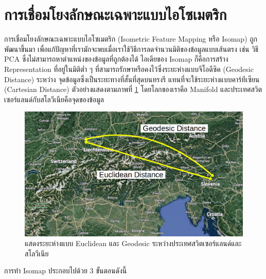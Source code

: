 \section{การเชื่อมโยงลักษณะเฉพาะแบบไอโซเมตริก}
\label{sec:isomap}

การเชื่อมโยงลักษณะเฉพาะแบบไอโซเมตริก (Isometric Feature Mapping หรือ Isomap)\autocite{tenenbaum2000} ถูกพัฒนาขึ้นมา%
เพื่อแก้ปัญหาที่เรามักจะพบเมื่อเราใช้วิธีการลดจำนวนมิติของข้อมูลแบบเส้นตรง เช่น วิธี PCA ซึ่งไม่สามารถหาตำแหน่งของข้อมูลที่ถูกต้องได้ ไอเดียของ 
Isomap ก็คือการสร้าง Representation ที่อยู่ในมิติต่ำ ๆ ที่สามารถรักษาหรือคงไว้ซึ่งระยะห่างแบบจีโอดีซิค (Geodesic Distance) ระหว่าง%
จุดข้อมูลซึ่งเป็นระยะทางที่สั้นที่สุดบนทรงรี แทนที่จะใช้ระยะห่างแบบคาร์ทีเซียน (Cartesian Distance) ตัวอย่างแสดงตามภาพที่
\ref{fig:map_geodesic_euclidean} โดยโลกของเราคือ Manifold และประเทศสวิตเซอร์แลนด์กับสโลวีเนียคือจุดของข้อมูล

\begin{figure}[htbp]
    \centering
    \includegraphics[width=0.9\linewidth]{fig/map_geodesic_euclidean.png}
    \caption{แสดงระยะห่างแบบ Euclidean และ Geodesic ระหว่างประเทศสวิตเซอร์แลนด์และสโลวีเนีย}
    \label{fig:map_geodesic_euclidean}
\end{figure}

การทำ Isomap ประกอบไปด้วย 3 ขั้นตอนดังนี้ 

